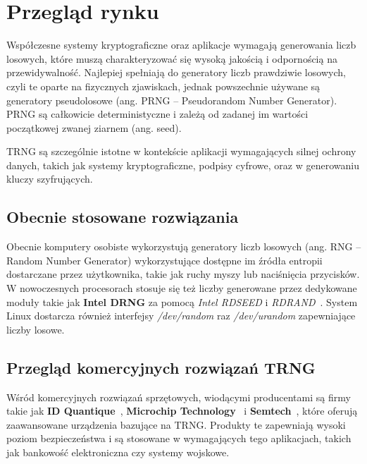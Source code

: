 \chapter{Przegląd rynku}\label{ch:przeglad-rynku}

Współczesne systemy kryptograficzne oraz aplikacje wymagają generowania liczb losowych,
które muszą charakteryzować się wysoką jakością i odpornością na przewidywalność.
Najlepiej spełniają do generatory liczb prawdziwie losowych, czyli te oparte na fizycznych zjawiskach,
jednak powszechnie używane są generatory pseudolosowe (ang. PRNG -- Pseudorandom Number Generator).
PRNG są całkowicie deterministyczne i zależą od zadanej im wartości początkowej zwanej ziarnem (ang. seed).

TRNG są szczególnie istotne w kontekście aplikacji wymagających silnej ochrony danych,
takich jak systemy kryptograficzne, podpisy cyfrowe, oraz w generowaniu kluczy szyfrujących.

\section{Obecnie stosowane rozwiązania}\label{sec:obecnie-stosowane-rozwiazania}

Obecnie komputery osobiste wykorzystują generatory liczb losowych (ang. RNG -- Random Number Generator)
wykorzystujące dostępne im źródła entropii dostarczane przez użytkownika, takie jak ruchy myszy lub naciśnięcia przycisków.
W nowoczesnych procesorach stosuje się też liczby generowane przez dedykowane moduły takie jak \textbf{Intel DRNG} za pomocą \textit{Intel RDSEED} i \textit{RDRAND}~\cite{IntelRD}.
System Linux dostarcza również interfejsy \textit{/dev/random} raz \textit{/dev/urandom} zapewniające liczby losowe.

\section{Przegląd komercyjnych rozwiązań TRNG}\label{sec:przeglad-komercyjnych-rozwiazan-trng}

Wśród komercyjnych rozwiązań sprzętowych, wiodącymi producentami są firmy takie jak
\textbf{ID Quantique}~\cite{IDQ}, \textbf{Microchip Technology}~\cite{MicrochipTechnology} i \textbf{Semtech}~\cite{Semtech},
które oferują zaawansowane urządzenia bazujące na TRNG.
Produkty te zapewniają wysoki poziom bezpieczeństwa i są stosowane w wymagających tego aplikacjach,
takich jak bankowość elektroniczna czy systemy wojskowe.

